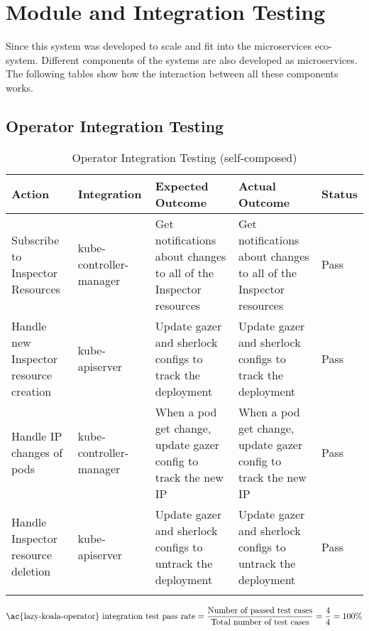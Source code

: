 \section{Module and Integration Testing}\label{sec:module-integration-testing}

Since this system was developed to scale and fit into the microservices eco-system. Different components of the systems are also developed as microservices. The following tables show how the interaction between all these components works.

\subsection{Operator Integration Testing}

\begin{longtable}{|p{30mm}|p{21mm}|p{40mm}|p{40mm}|p{10mm}|}
    \hline
    \textbf{Action} &
    \textbf{Integration} &
    \textbf{Expected Outcome} &
    \textbf{Actual Outcome} &
    \textbf{Status} \\ \hline
    Subscribe to Inspector Resources &
    kube-controller-manager &
    Get notifications about changes to all of the Inspector resources &
    Get notifications about changes to all of the Inspector resources &
    Pass \\ \hline
    Handle new Inspector resource creation &
    kube-apiserver &
    Update \ac{gazer} and \ac{sherlock} configs to track the deployment &
    Update \ac{gazer} and \ac{sherlock} configs to track the deployment &
    Pass \\ \hline
    Handle IP changes of pods &
    kube-controller-manager &
    When a pod get change, update \ac{gazer} config to track the new IP &
    When a pod get change, update \ac{gazer} config to track the new IP &
    Pass \\ \hline
    Handle Inspector resource deletion &
    kube-apiserver &
    Update \ac{gazer} and \ac{sherlock} configs to untrack the deployment &
    Update \ac{gazer} and \ac{sherlock} configs to untrack the deployment &
    Pass \\ \hline
    \caption{Operator Integration Testing (self-composed)}
\end{longtable}

\begingroup
\setlength{\abovedisplayskip}{-0.5cm}
\[
\text{\ac{lazy-koala-operator} integration test pass rate} = \frac{\text{Number of passed test cases}}{\text{Total number of test cases}} = \frac{4}{4} = 100\%
\]
\endgroup

